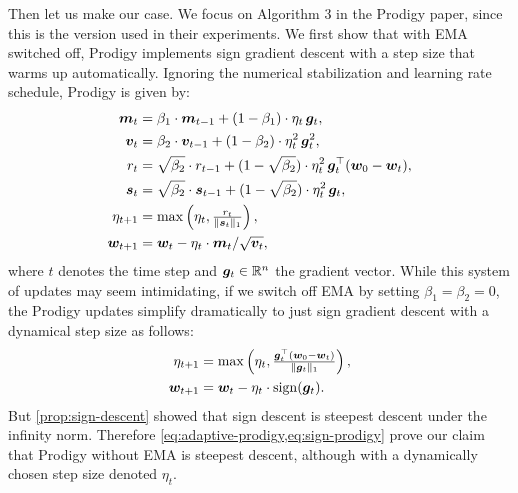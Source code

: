 Then let us make our case. We focus on Algorithm 3 in the Prodigy paper, since this is the version used in their experiments. We first show that with EMA switched off, Prodigy implements sign gradient descent with a step size that warms up automatically. Ignoring the numerical stabilization and learning rate schedule, Prodigy is given by:
\begin{align}
    {\bm{m}}_t &= \beta_1 \cdot {\bm{m}}_{t-1} + (1 - \beta_1) \cdot \eta_t \,{\bm{g}}_t, \\
    {\bm{v}}_t &= \beta_2 \cdot {\bm{v}}_{t-1} + (1 - \beta_2) \cdot \eta_t^2 \,{\bm{g}}_t^2, \\
    r_t &= \sqrt{\beta_2} \cdot r_{t-1} + (1-\sqrt{\beta_2}) \cdot \eta_t^2 \, {\bm{g}}_t^\top({\bm{w}}_0 - {\bm{w}}_t), \label{eq:r-prodigy} \\
    {\bm{s}}_t &= \sqrt{\beta_2} \cdot {\bm{s}}_{t-1} + (1-\sqrt{\beta_2}) \cdot \eta_t^2 \, {\bm{g}}_t, \label{eq:s-prodigy} \\
    \eta_{t+1} &= \max\left(\eta_t, \tfrac{r_t}{\Vert {{\bm{s}}_t} \Vert_1}\right), \label{eq:d-prodigy} \\
    {\bm{w}}_{t+1} &= {\bm{w}}_t - \eta_t \cdot {\bm{m}}_t / \sqrt{{\bm{v}}_t},
\end{align}
where $t$ denotes the time step and ${\bm{g}}_t \in \mathbb{R}^n$ the gradient vector. While this system of updates may seem intimidating, if we switch off EMA by setting $\beta_1 = \beta_2 = 0$, the Prodigy updates simplify dramatically to just sign gradient descent with a dynamical step size as follows:
\begin{align}
    \eta_{t+1} &= \max\left(\eta_t, \tfrac{{\bm{g}}_t^\top({\bm{w}}_0 - {\bm{w}}_t)}{\Vert {{\bm{g}}_t} \Vert_1}\right), \label{eq:adaptive-prodigy}
    \\
    {\bm{w}}_{t+1} &= {\bm{w}}_t - \eta_t \cdot \operatorname{sign} ({\bm{g}}_t).
    \label{eq:sign-prodigy}
\end{align}
But \cref{prop:sign-descent} showed that sign descent is steepest descent under the infinity norm. Therefore \cref{eq:adaptive-prodigy,eq:sign-prodigy} prove our claim that Prodigy without EMA is steepest descent, although with a dynamically chosen step size denoted $\eta_t$.

